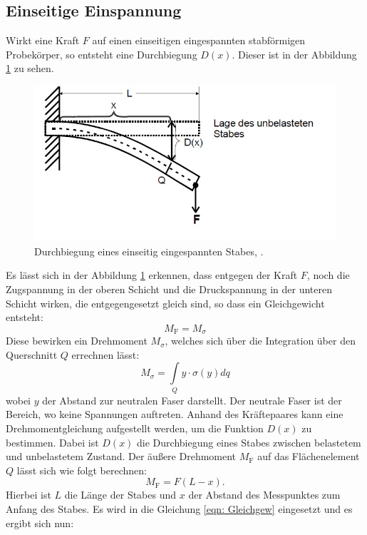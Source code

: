 \subsection{Einseitige Einspannung}
Wirkt eine Kraft $F$ auf einen einseitigen eingespannten stabförmigen Probekörper, so entsteht eine Durchbiegung $D(x)$. Dieser ist in der Abbildung \ref{fig:einseitig} zu sehen. 
\begin{figure}[h!]
	\centering
	\includegraphics[width=0.7\linewidth]{einseitig.jpg}
	\caption{Durchbiegung eines einseitig eingespannten Stabes, \cite[2]{anleitung103}.}
	\label{fig:einseitig}
\end{figure}
Es lässt sich in der Abbildung \ref{fig:einseitig} erkennen, dass entgegen der Kraft $F$, noch die Zugspannung in der oberen Schicht und die Druckspannung in der unteren Schicht wirken, die entgegengesetzt gleich sind, so dass ein Gleichgewicht entsteht:
\begin{equation}
\label{eqn: Gleichgew}
M_\text{F} = M_{\sigma}
\end{equation}
Diese bewirken ein Drehmoment $M_{\sigma}$, welches sich über die Integration über den Querschnitt $Q$ errechnen lässt:
\begin{equation*}
\label{eqn: Msigma}
M_{\sigma} = \int\limits_Q y \cdot \sigma(y) dq
\end{equation*}
wobei $y$ der Abstand zur neutralen Faser darstellt. Der neutrale Faser ist der Bereich, wo keine Spannungen auftreten.
Anhand des Kräftepaares kann eine Drehmomentgleichung aufgestellt werden, um die Funktion $D(x)$ zu bestimmen. Dabei ist $D(x)$ die Durchbiegung eines Stabes zwischen belastetem und unbelastetem Zustand. 
Der äußere Drehmoment $M_\text{F}$ auf das Flächenelement $Q$ lässt sich wie folgt berechnen:
\begin{equation*}
M_\text{F} = F(L-x).
\end{equation*}
Hierbei ist $L$ die Länge der Stabes und $x$ der Abstand des Messpunktes zum Anfang des Stabes.
Es wird in die Gleichung \ref{eqn: Gleichgew} eingesetzt und es ergibt sich nun: 
